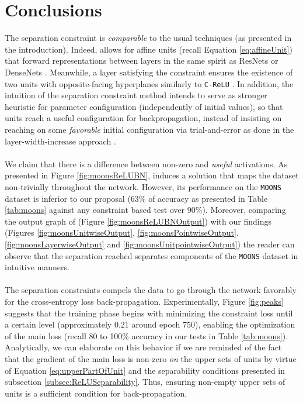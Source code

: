 \section{Conclusions}\label{sec:conclusions}


The separation constraint is \emph{comparable} to the usual techniques (as presented in the introduction). Indeed, \SepLayer allows for affine units (recall Equation \ref{eq:affineUnit}) that forward representations between layers in the same spirit as ResNets \cite{resnet} or DenseNets \cite{densenet}. Meanwhile, a layer satisfying the \SepPoint constraint ensures the existence of two units with opposite-facing hyperplanes similarly to \texttt{C-ReLU} \cite{crelu}. In addition, the intuition of the separation constraint method intends to serve as stronger heuristic for parameter configuration (independently of initial values), so that units reach a useful configuration for backpropagation, instead of insisting on reaching on some \emph{favorable} initial configuration via trial-and-error as done in the layer-width-increase approach \cite{wideresnet,inceptionv1}.   
\\\\
We claim that there is a difference between non-zero and \emph{useful} activations. As presented in Figure \ref{fig:moonsReLUBN}, \ReLUBN induces a solution that maps the dataset non-trivially throughout the network. However, its performance on the \texttt{MOONS} dataset is inferior to our proposal (63\% of accuracy as presented in Table \ref{tab:moons} against any constraint based test over 90\%). Moreover, comparing the output graph of \ReLUBN (Figure \ref{fig:moonsReLUBNOutput}) with our findings (Figures \ref{fig:moonsUnitwiseOutput}, \ref{fig:moonsPointwiseOutput}. \ref{fig:moonsLayerwiseOutput} and \ref{fig:moonsUnitpointwiseOutput}) the reader can observe that the separation reached separates components of the \texttt{MOONS} dataset in intuitive manners.  
\\\\
The separation constraints compels the data to go through the network favorably for the cross-entropy loss back-propagation. Experimentally, Figure \ref{fig:peaks} suggests that the training phase begins with minimizing the constraint loss until a certain level (approximately $0.21$ around epoch 750), enabling the optimization of the main loss (recall 80 to 100\% accuracy in our tests in Table \ref{tab:moons}). Analytically, we can elaborate on this behavior if we are reminded of the fact that the gradient of the main loss is non-zero \emph{on} the upper sets of units by virtue of Equation \ref{eq:upperPartOfUnit} and the separability conditions presented in subsection \ref{subsec:ReLUSeparability}. Thus, ensuring non-empty upper sets of units is a sufficient condition for back-propagation. 

